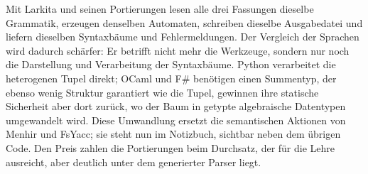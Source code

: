 Mit Larkita und seinen Portierungen lesen alle drei Fassungen dieselbe Grammatik, erzeugen denselben Automaten, schreiben dieselbe Ausgabedatei und liefern dieselben Syntaxbäume und Fehlermeldungen.
Der Vergleich der Sprachen wird dadurch schärfer: Er betrifft nicht mehr die Werkzeuge, sondern nur noch die Darstellung und Verarbeitung der Syntaxbäume.
Python verarbeitet die heterogenen Tupel direkt; OCaml und F\# benötigen einen Summentyp, der ebenso wenig Struktur garantiert wie die Tupel, gewinnen ihre statische Sicherheit aber dort zurück, wo der Baum in getypte algebraische Datentypen umgewandelt wird.
Diese Umwandlung ersetzt die semantischen Aktionen von Menhir und FsYacc; sie steht nun im Notizbuch, sichtbar neben dem übrigen Code.
Den Preis zahlen die Portierungen beim Durchsatz, der für die Lehre ausreicht, aber deutlich unter dem generierter Parser liegt.
